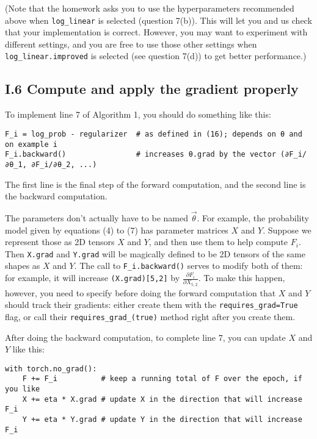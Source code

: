 \documentclass[12pt]{article}
\theoremstyle{plain}
\theoremstyle{definition}
\theoremstyle{remark}
\begin{document}
(Note that the homework asks you to use the hyperparameters recommended above when \texttt{log\_linear} is selected (question 7(b)). This will let you and us check that your implementation is correct. However, you may want to experiment with different settings, and you are free to use those other settings when \texttt{log\_linear.improved} is selected (see question 7(d)) to get better performance.)

\subsection*{I.6 Compute and apply the gradient properly}

To implement line 7 of Algorithm 1, you should do something like this:
\begin{verbatim}
F_i = log_prob - regularizer  # as defined in (16); depends on θ and on example i
F_i.backward()                # increases θ.grad by the vector (∂F_i/∂θ_1, ∂F_i/∂θ_2, ...)
\end{verbatim}

The first line is the final step of the forward computation, and the second line is the backward computation.

The parameters don’t actually have to be named $\vec{\theta}$. For example, the probability model given by equations (4) to (7) has parameter matrices $X$ and $Y$. Suppose we represent those as 2D tensors $X$ and $Y$, and then use them to help compute $F_i$. Then \texttt{X.grad} and \texttt{Y.grad} will be magically defined to be 2D tensors of the same shapes as $X$ and $Y$. The call to \texttt{F\_i.backward()} serves to modify both of them: for example, it will increase \texttt{(X.grad)[5,2]} by $\frac{\partial F_i}{\partial X_{5,2}}$. To make this happen, however, you need to specify before doing the forward computation that $X$ and $Y$ should track their gradients: either create them with the \texttt{requires\_grad=True} flag, or call their \texttt{requires\_grad\_(true)} method right after you create them.

After doing the backward computation, to complete line 7, you can update $X$ and $Y$ like this:
\begin{verbatim}
with torch.no_grad():
    F += F_i          # keep a running total of F over the epoch, if you like
    X += eta * X.grad # update X in the direction that will increase F_i
    Y += eta * Y.grad # update Y in the direction that will increase F_i
\end{verbatim}
\end{document}
